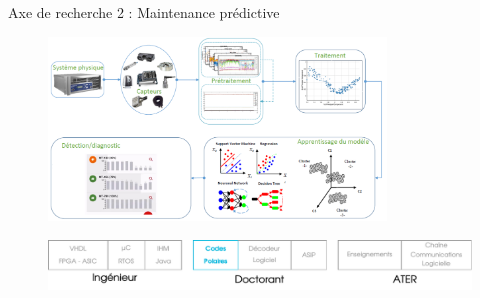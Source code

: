 \documentclass[t,compress,mathserif,12pt,xcolor=dvipsnames]{beamer}
\begin{document}
\begin{frame}[t]{Axe de recherche 2 : Maintenance prédictive}

  \begin{minipage}[t][5.0cm][t]{\textwidth}
    \vspace*{-0.5cm}
    \begin{figure}[htp]
      \centering
      \includegraphics[width=0.8\textwidth]{fig/research/worldcast/phm.pdf}
    \end{figure}
  \end{minipage}
  \begin{figure}[htp]
    \centering
    \includegraphics[width=\textwidth]{fig/frise20}
  \end{figure}
\end{frame}
\end{document}
